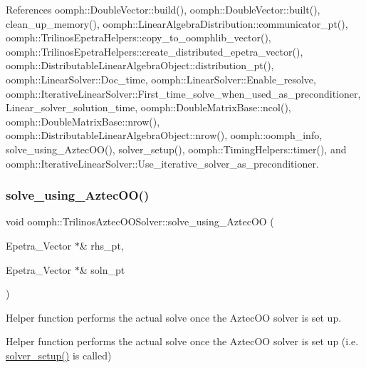 References oomph\+::\+Double\+Vector\+::build(), oomph\+::\+Double\+Vector\+::built(), clean\+\_\+up\+\_\+memory(), oomph\+::\+Linear\+Algebra\+Distribution\+::communicator\+\_\+pt(), oomph\+::\+Trilinos\+Epetra\+Helpers\+::copy\+\_\+to\+\_\+oomphlib\+\_\+vector(), oomph\+::\+Trilinos\+Epetra\+Helpers\+::create\+\_\+distributed\+\_\+epetra\+\_\+vector(), oomph\+::\+Distributable\+Linear\+Algebra\+Object\+::distribution\+\_\+pt(), oomph\+::\+Linear\+Solver\+::\+Doc\+\_\+time, oomph\+::\+Linear\+Solver\+::\+Enable\+\_\+resolve, oomph\+::\+Iterative\+Linear\+Solver\+::\+First\+\_\+time\+\_\+solve\+\_\+when\+\_\+used\+\_\+as\+\_\+preconditioner, Linear\+\_\+solver\+\_\+solution\+\_\+time, oomph\+::\+Double\+Matrix\+Base\+::ncol(), oomph\+::\+Double\+Matrix\+Base\+::nrow(), oomph\+::\+Distributable\+Linear\+Algebra\+Object\+::nrow(), oomph\+::oomph\+\_\+info, solve\+\_\+using\+\_\+\+Aztec\+O\+O(), solver\+\_\+setup(), oomph\+::\+Timing\+Helpers\+::timer(), and oomph\+::\+Iterative\+Linear\+Solver\+::\+Use\+\_\+iterative\+\_\+solver\+\_\+as\+\_\+preconditioner.

\mbox{\label{classoomph_1_1TrilinosAztecOOSolver_a419638218c26238bab55674304c5fc98}} 
\subsubsection{\texorpdfstring{solve\+\_\+using\+\_\+\+Aztec\+O\+O()}{solve\_using\_AztecOO()}}
{\footnotesize\ttfamily void oomph\+::\+Trilinos\+Aztec\+O\+O\+Solver\+::solve\+\_\+using\+\_\+\+Aztec\+OO (\begin{DoxyParamCaption}\item[{Epetra\+\_\+\+Vector $\ast$\&}]{rhs\+\_\+pt,  }\item[{Epetra\+\_\+\+Vector $\ast$\&}]{soln\+\_\+pt }\end{DoxyParamCaption})\hspace{0.3cm}{\ttfamily [protected]}}



Helper function performs the actual solve once the Aztec\+OO solver is set up. 

Helper function performs the actual solve once the Aztec\+OO solver is set up (i.\+e. \hyperlink{classoomph_1_1TrilinosAztecOOSolver_a1d5e7dfc9fe3c890569465a167c2f2fc}{solver\+\_\+setup()} is called) 

